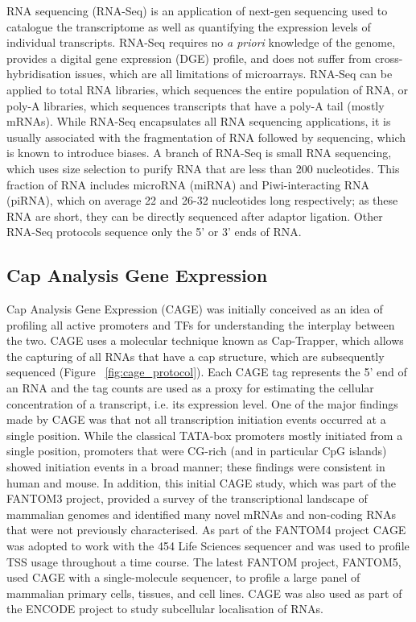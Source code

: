 RNA sequencing (RNA-Seq) is an application of next-gen sequencing used to catalogue the transcriptome as well as quantifying the expression levels of individual transcripts\cite{pmid19015660}. RNA-Seq requires no \textit{a priori} knowledge of the genome, provides a digital gene expression (DGE) profile, and does not suffer from cross-hybridisation issues, which are all limitations of microarrays. RNA-Seq can be applied to total RNA libraries, which sequences the entire population of RNA, or poly-A libraries, which sequences transcripts that have a poly-A tail (mostly mRNAs). While RNA-Seq encapsulates all RNA sequencing applications, it is usually associated with the fragmentation of RNA followed by sequencing, which is known to introduce biases\cite{pmid18516045}. A branch of RNA-Seq is small RNA sequencing, which uses size selection to purify RNA that are less than 200 nucleotides. This fraction of RNA includes microRNA (miRNA) and Piwi-interacting RNA (piRNA), which on average 22 and 26-32 nucleotides long respectively; as these RNA are short, they can be directly sequenced after adaptor ligation. Other RNA-Seq protocols sequence only the 5'\cite{pmid15300261,pmid14663149} or 3'\cite{pmid22454233} ends of RNA.

\subsection{Cap Analysis Gene Expression}

Cap Analysis Gene Expression (CAGE) was initially conceived as an idea of profiling all active promoters and TFs for understanding the interplay between the two\cite{carninci2010capanalysis}. CAGE uses a molecular technique known as Cap-Trapper\cite{pmid8938445,pmid9179497}, which allows the capturing of all RNAs that have a cap structure, which are subsequently sequenced (Figure ~\ref{fig:cage_protocol}). Each CAGE tag represents the 5' end of an RNA and the tag counts are used as a proxy for estimating the cellular concentration of a transcript, i.e. its expression level. One of the major findings made by CAGE was that not all transcription initiation events occurred at a single position\cite{pmid16645617}. While the classical TATA-box promoters mostly initiated from a single position, promoters that were CG-rich (and in particular CpG islands) showed initiation events in a broad manner; these findings were consistent in human and mouse\cite{pmid16645617}. In addition, this initial CAGE study, which was part of the FANTOM3 project, provided a survey of the transcriptional landscape of mammalian genomes and identified many novel mRNAs and non-coding RNAs that were not previously characterised\cite{pmid16141072}. As part of the FANTOM4 project CAGE was adopted to work with the 454 Life Sciences sequencer and was used to profile TSS usage throughout a time course. The latest FANTOM project, FANTOM5, used CAGE with a single-molecule sequencer, to profile a large panel of mammalian primary cells, tissues, and cell lines\cite{pmid24670764}. CAGE was also used as part of the ENCODE project to study subcellular localisation of RNAs\cite{pmid22955620}.

